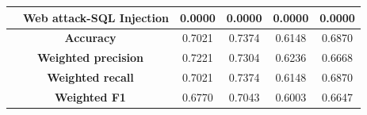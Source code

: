 \begin{table}[htbp]
\begin{tabular}{llcccc}
{{ & Web attack-SQL Injection & 0.0000 & 0.0000 & 0.0000 & 0.0000 \\
\midrule
\multicolumn{2}{c}{\textbf{Accuracy}} & 0.7021 & 0.7374 & 0.6148 & 0.6870 \\
\midrule
\multicolumn{2}{c}{\textbf{Weighted precision}} & 0.7221 & 0.7304 & 0.6236 & 0.6668 \\
\midrule
\multicolumn{2}{c}{\textbf{Weighted recall}} & 0.7021 & 0.7374 & 0.6148 & 0.6870 \\
\midrule
\multicolumn{2}{c}{\textbf{Weighted F1}} & 0.6770 & 0.7043 & 0.6003 & 0.6647 \\
\bottomrule
\end{tabular}
\end{table}
